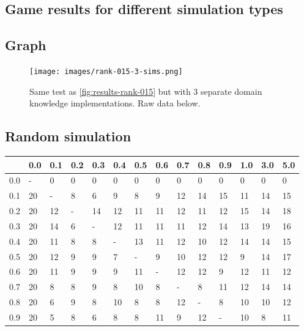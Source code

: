 \documentclass[
11pt, %
english, %
singlespacing, %
headsepline, %
]{MastersDoctoralThesis} %
\begin{document}
\begin{appendices}
\section{Game results for different simulation types}

\subsection{Graph}
\begin{figure}[H]
	\centering
	\texttt{[image: images/rank-015-3-sims.png]}
	\caption{Same test as \ref{fig:results-rank-015} but with 3 separate domain knowledge implementations. Raw data below.}
\end{figure}

\subsection{Random simulation}
\begin{table}[H]
	\centering
	\begin{tabular}{|l||l|l|l|l|l|l|l|l|l|l|l|l|l|}
		\hline
		& 0.0 & 0.1 & 0.2 & 0.3 & 0.4 & 0.5 & 0.6 & 0.7 & 0.8 & 0.9 & 1.0 & 3.0 & 5.0 \\ \hline
	    \hline
		0.0 & -   & 0   & 0   & 0   & 0   & 0   & 0   & 0   & 0   & 0   & 0   & 0   & 0   \\ \hline
		0.1 & 20  & -   & 8   & 6   & 9   & 8   & 9   & 12  & 14  & 15  & 11  & 14  & 15  \\ \hline
		0.2 & 20  & 12  & -   & 14  & 12  & 11  & 11  & 12  & 11  & 12  & 15  & 14  & 18  \\ \hline
		0.3 & 20  & 14  & 6   & -   & 12  & 11  & 11  & 11  & 12  & 14  & 13  & 19  & 16  \\ \hline
		0.4 & 20  & 11  & 8   & 8   & -   & 13  & 11  & 12  & 10  & 12  & 14  & 14  & 15  \\ \hline
		0.5 & 20  & 12  & 9   & 9   & 7   & -   & 9   & 10  & 12  & 12  & 9   & 14  & 17  \\ \hline
		0.6 & 20  & 11  & 9   & 9   & 9   & 11  & -   & 12  & 12  & 9   & 12  & 11  & 12  \\ \hline
		0.7 & 20  & 8   & 8   & 9   & 8   & 10  & 8   & -   & 8   & 11  & 12  & 14  & 14  \\ \hline
		0.8 & 20  & 6   & 9   & 8   & 10  & 8   & 8   & 12  & -   & 8   & 10  & 10  & 12  \\ \hline
		0.9 & 20  & 5   & 8   & 6   & 8   & 8   & 11  & 9   & 12  & -   & 10  & 8   & 11  \\ \hline

\end{tabular}
\end{table}
\end{appendices}
\end{document}
